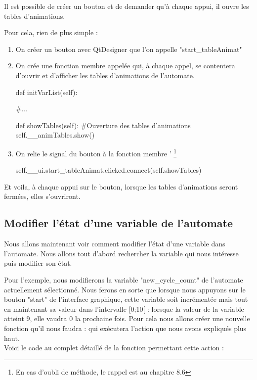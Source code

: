 Il est possible de créer un bouton et de demander qu'à chaque appui, il ouvre les tables d'animations.

Pour cela, rien de plus simple :

\begin{enumerate}
    \item On créer un bouton avec QtDesigner que l'on appelle "start\_tableAnimat"
    \item On crée une fonction membre appelée  qui, à chaque appel, se contentera d'ouvrir et d'afficher les tables d'animations de l'automate.
    
    \begin{Python}
        def initVarList(self):
        
            #...
        
        def showTables(self):
            #Ouverture des tables d'animations
            self.__animTables.show()
    \end{Python}
    \item On relie le signal du bouton à la fonction membre  ' \footnote{En cas d'oubli de méthode, le rappel est au chapitre 8.6}
    
    \begin{Python}
        self.__ui.start_tableAnimat.clicked.connect(self.showTables)
    \end{Python}
   
\end{enumerate}

Et voila, à chaque appui sur le bouton, lorsque les tables d'animations seront fermées, elles s'ouvriront.

\subsection{Modifier l'état d'une variable de l'automate}

Nous allons maintenant voir comment modifier l'état d'une variable dans l'automate.\newline
Nous allons tout d'abord rechercher la variable qui nous intéresse puis modifier son état.

Pour l'exemple, nous modifierons la variable "new\_cycle\_count" de l'automate actuellement sélectionné.\newline
Nous ferons en sorte que lorsque nous appuyons sur le bouton "start" de l'interface graphique, cette variable soit incrémentée mais tout en maintenant sa valeur dans l'intervalle [0;10[ : lorsque la valeur de la variable atteint 9, elle vaudra 0 la prochaine fois.\newline
Pour cela nous allons créer une nouvelle fonction qu'il nous faudra  :  qui exécutera l'action que nous avons expliqués plus haut.\\
Voici le code au complet détaillé de la fonction permettant cette action :

